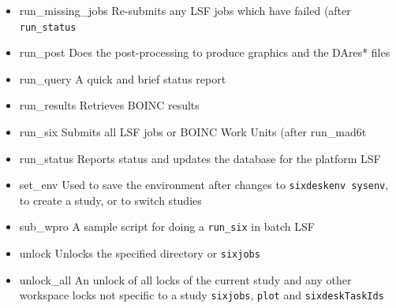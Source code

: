 \documentclass{cernatsnote}
\begin{document}
\begin{itemize}
\item run\_missing\_jobs Re-submits any LSF jobs which have failed (after \texttt{run\_status}
\item run\_post Does the post-processing to produce graphics and the DAres* files
\item run\_query A quick and brief status report
\item run\_results Retrieves BOINC results
\item run\_six Submits all LSF jobs or BOINC Work Units (after {run\_mad6t}
\item run\_status Reports status and updates the database for the platform LSF
\item set\_env Used to save the environment after changes to \texttt{sixdeskenv sysenv},
 to create a study, or to switch studies
\item sub\_wpro A sample script for doing a \texttt{run\_six} in batch LSF
\item unlock Unlocks the specified directory or \texttt{sixjobs}
\item unlock\_all An unlock of all locks of the current study and any other 
workspace locks not specific to a study \texttt{sixjobs}, 
\texttt{plot} and \texttt{sixdeskTaskIds}
\end{itemize}
\end{document}
